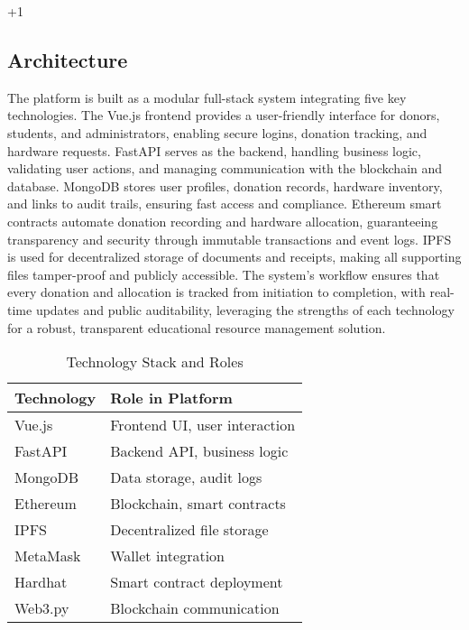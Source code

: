+1\documentclass[conference]{IEEEtran}
\begin{document}
\subsection{Architecture}
The platform is built as a modular full-stack system integrating five key technologies. The Vue.js frontend provides a user-friendly interface for donors, students, and administrators, enabling secure logins, donation tracking, and hardware requests. FastAPI serves as the backend, handling business logic, validating user actions, and managing communication with the blockchain and database. MongoDB stores user profiles, donation records, hardware inventory, and links to audit trails, ensuring fast access and compliance. Ethereum smart contracts automate donation recording and hardware allocation, guaranteeing transparency and security through immutable transactions and event logs. IPFS is used for decentralized storage of documents and receipts, making all supporting files tamper-proof and publicly accessible. The system’s workflow ensures that every donation and allocation is tracked from initiation to completion, with real-time updates and public auditability, leveraging the strengths of each technology for a robust, transparent educational resource management solution.

\begin{table}[ht] %
\caption{Technology Stack and Roles}
\centering
\begin{tabular}{|l|l|} %
\hline
\textbf{Technology} & \textbf{Role in Platform} \\
\hline
Vue.js & Frontend UI, user interaction \\
FastAPI & Backend API, business logic \\
MongoDB & Data storage, audit logs \\
Ethereum & Blockchain, smart contracts \\
IPFS & Decentralized file storage \\
MetaMask & Wallet integration \\
Hardhat & Smart contract deployment \\
Web3.py & Blockchain communication \\
\hline
\end{tabular}
\label{tab:techstack}
\end{table}
\end{document}
